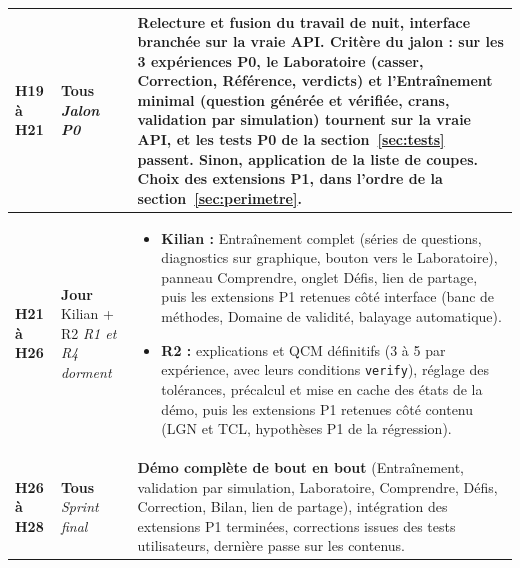 \documentclass[11pt,a4paper]{article}
\begin{document}
\begin{longtable}{@{}L{1.9cm} L{2.4cm} >{\raggedright\arraybackslash}p{\dimexpr\textwidth-4.3cm-4\tabcolsep\relax}@{}}
  \textbf{H19 à H21}  &
  \textbf{Tous} \newline \emph{Jalon P0} &
  Relecture et fusion du travail de nuit, interface branchée sur la vraie API. \textbf{Critère du jalon :} sur les 3 expériences P0, le Laboratoire (casser, Correction, Référence, verdicts) et l'Entraînement minimal (question générée et vérifiée, crans, validation par simulation) tournent sur la vraie API, et les tests P0 de la section~\ref{sec:tests} passent. Sinon, \textbf{application de la liste de coupes}. Choix des extensions P1, dans l'ordre de la section~\ref{sec:perimetre}. \\
  \midrule

  \textbf{H21 à H26}  &
  \textbf{Jour} \newline Kilian + R2 \newline \emph{R1 et R4 dorment} &
  \begin{itemize}[leftmargin=*, nosep]
    \item \textbf{Kilian :} Entraînement complet (séries de questions, diagnostics sur graphique, bouton vers le Laboratoire), panneau Comprendre, onglet Défis, lien de partage, puis les extensions P1 retenues côté interface (banc de méthodes, Domaine de validité, balayage automatique).
    \item \textbf{R2 :} explications et QCM définitifs (3 à 5 par expérience, avec leurs conditions \texttt{verify}), réglage des tolérances, précalcul et mise en cache des états de la démo, puis les extensions P1 retenues côté contenu (LGN et TCL, hypothèses P1 de la régression).
  \end{itemize} \\
  \midrule

  \textbf{H26 à H28}  &
  \textbf{Tous} \newline \emph{Sprint final} &
  \textbf{Démo complète de bout en bout} (Entraînement, validation par simulation, Laboratoire, Comprendre, Défis, Correction, Bilan, lien de partage), intégration des extensions P1 terminées, corrections issues des tests utilisateurs, dernière passe sur les contenus. \\
  \midrule


\end{longtable}
\end{document}
